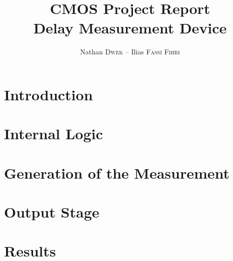 
\title{CMOS Project Report\\Delay Measurement Device}
\author{Nathan \textsc{Dwek} -- Ilias \textsc{Fassi Fihri}}


\maketitle
\tableofcontents
\clearpage
\hypersetup{allcolors=link}
\section{Introduction}


\section{Internal Logic}


\section{Generation of the Measurement}


\section{Output Stage}


\newpage
\section{Results}



